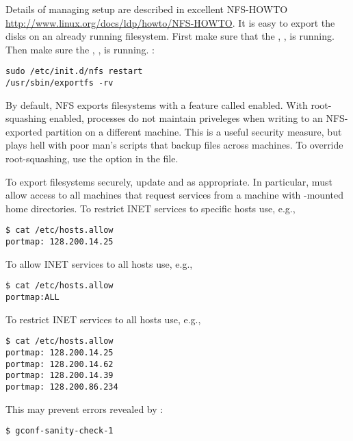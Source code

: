 \documentclass[12pt,twoside]{article}
\begin{document}
Details of managing setup are described in excellent NFS-HOWTO
\url{http://www.linux.org/docs/ldp/howto/NFS-HOWTO}.
It is easy to export the disks on an already running filesystem.
First make sure that the , , is running.
Then make sure the , , is running.
:
\begin{verbatim}
sudo /etc/init.d/nfs restart
/usr/sbin/exportfs -rv
\end{verbatim}
By default, NFS exports filesystems with a feature called
 enabled.
With root-squashing enabled, processes do not maintain 
priveleges when writing to an NFS-exported partition on a different
machine. 
This is a useful security measure, but plays hell with poor man's
 scripts that backup files across machines. 
To override root-squashing, use the  option
in the  file.

To export  filesystems securely, update  
and  as appropriate. 
In particular,  must allow access to all machines
that request  services from a machine with
-mounted home directories.
To restrict INET services to specific hosts use, e.g.,
\begin{verbatim}
$ cat /etc/hosts.allow
portmap: 128.200.14.25
\end{verbatim}
To allow INET services to all hosts use, e.g.,
\begin{verbatim}
$ cat /etc/hosts.allow
portmap:ALL
\end{verbatim}
To restrict INET services to all hosts use, e.g.,
\begin{verbatim}
$ cat /etc/hosts.allow
portmap: 128.200.14.25
portmap: 128.200.14.62
portmap: 128.200.14.39
portmap: 128.200.86.234
\end{verbatim}
This may prevent errors revealed by :
\begin{verbatim}
$ gconf-sanity-check-1
\end{verbatim}
\end{document}

